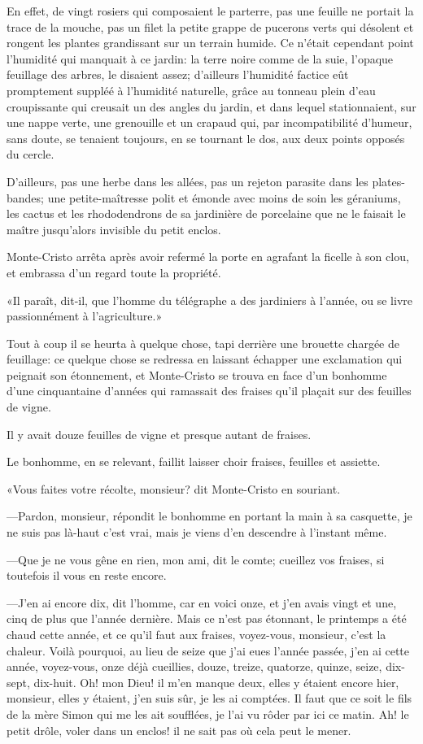 En effet, de vingt rosiers qui composaient le parterre, pas une feuille ne portait la trace de la mouche, pas un filet la petite grappe de pucerons verts qui désolent et rongent les plantes grandissant sur un terrain humide. Ce n'était cependant point l'humidité qui manquait à ce jardin: la terre noire comme de la suie, l'opaque feuillage des arbres, le disaient assez; d'ailleurs l'humidité factice eût promptement suppléé à l'humidité naturelle, grâce au tonneau plein d'eau croupissante qui creusait un des angles du jardin, et dans lequel stationnaient, sur une nappe verte, une grenouille et un crapaud qui, par incompatibilité d'humeur, sans doute, se tenaient toujours, en se tournant le dos, aux deux points opposés du cercle. 

D'ailleurs, pas une herbe dans les allées, pas un rejeton parasite dans les plates-bandes; une petite-maîtresse polit et émonde avec moins de soin les géraniums, les cactus et les rhododendrons de sa jardinière de porcelaine que ne le faisait le maître jusqu'alors invisible du petit enclos. 

Monte-Cristo arrêta après avoir refermé la porte en agrafant la ficelle à son clou, et embrassa d'un regard toute la propriété. 

«Il paraît, dit-il, que l'homme du télégraphe a des jardiniers à l'année, ou se livre passionnément à l'agriculture.» 

Tout à coup il se heurta à quelque chose, tapi derrière une brouette chargée de feuillage: ce quelque chose se redressa en laissant échapper une exclamation qui peignait son étonnement, et Monte-Cristo se trouva en face d'un bonhomme d'une cinquantaine d'années qui ramassait des fraises qu'il plaçait sur des feuilles de vigne. 

Il y avait douze feuilles de vigne et presque autant de fraises. 

Le bonhomme, en se relevant, faillit laisser choir fraises, feuilles et assiette. 

«Vous faites votre récolte, monsieur? dit Monte-Cristo en souriant. 

—Pardon, monsieur, répondit le bonhomme en portant la main à sa casquette, je ne suis pas là-haut c'est vrai, mais je viens d'en descendre à l'instant même. 

—Que je ne vous gêne en rien, mon ami, dit le comte; cueillez vos fraises, si toutefois il vous en reste encore.  

—J'en ai encore dix, dit l'homme, car en voici onze, et j'en avais vingt et une, cinq de plus que l'année dernière. Mais ce n'est pas étonnant, le printemps a été chaud cette année, et ce qu'il faut aux fraises, voyez-vous, monsieur, c'est la chaleur. Voilà pourquoi, au lieu de seize que j'ai eues l'année passée, j'en ai cette année, voyez-vous, onze déjà cueillies, douze, treize, quatorze, quinze, seize, dix-sept, dix-huit. Oh! mon Dieu! il m'en manque deux, elles y étaient encore hier, monsieur, elles y étaient, j'en suis sûr, je les ai comptées. Il faut que ce soit le fils de la mère Simon qui me les ait soufflées, je l'ai vu rôder par ici ce matin. Ah! le petit drôle, voler dans un enclos! il ne sait pas où cela peut le mener. 

